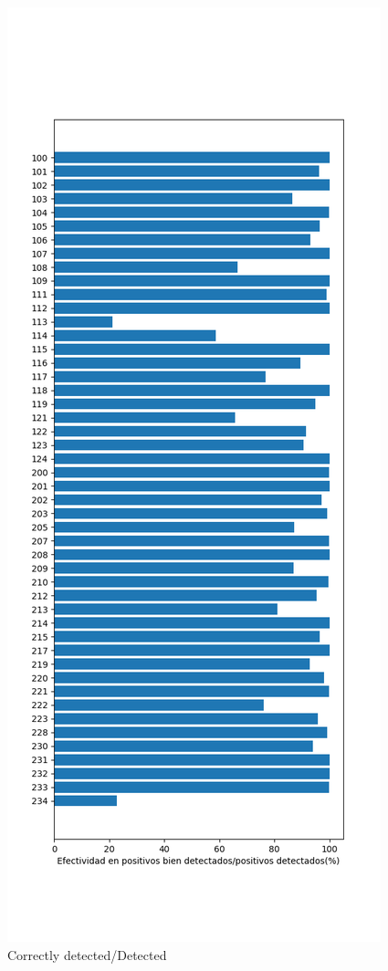 \documentclass[conference]{IEEEtran}
\begin{document}
\begin{figure}[H]
\centerline{\includegraphics[scale=0.4]{imagenes/EfectividadDetectados}}
\caption{Correctly detected/Detected}
\label{fig}
\end{figure}
\end{document}
